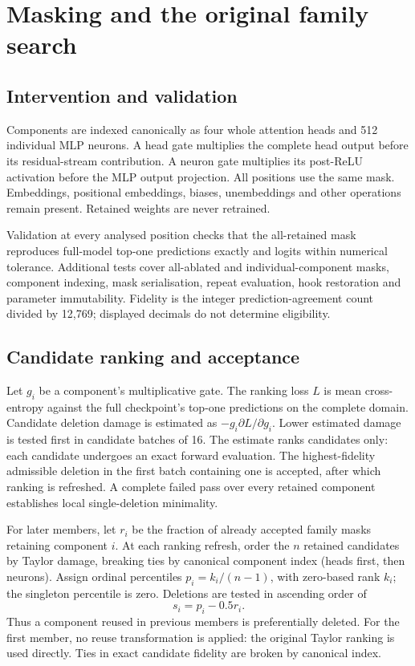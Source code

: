 \documentclass[10pt]{article}
\begin{document}
\section{Masking and the original family search}
\label{sec:ssearch}
\subsection{Intervention and validation}
Components are indexed canonically as four whole attention heads and 512 individual MLP neurons. A head gate multiplies the complete head output before its residual-stream contribution. A neuron gate multiplies its post-ReLU activation before the MLP output projection. All positions use the same mask. Embeddings, positional embeddings, biases, unembeddings and other operations remain present. Retained weights are never retrained.

Validation at every analysed position checks that the all-retained mask reproduces full-model top-one predictions exactly and logits within numerical tolerance. Additional tests cover all-ablated and individual-component masks, component indexing, mask serialisation, repeat evaluation, hook restoration and parameter immutability. Fidelity is the integer prediction-agreement count divided by 12,769; displayed decimals do not determine eligibility.

\subsection{Candidate ranking and acceptance}
Let $g_i$ be a component's multiplicative gate. The ranking loss $L$ is mean cross-entropy against the full checkpoint's top-one predictions on the complete domain. Candidate deletion damage is estimated as $-g_i\partial L/\partial g_i$. Lower estimated damage is tested first in candidate batches of 16. The estimate ranks candidates only: each candidate undergoes an exact forward evaluation. The highest-fidelity admissible deletion in the first batch containing one is accepted, after which ranking is refreshed. A complete failed pass over every retained component establishes local single-deletion minimality.

For later members, let $r_i$ be the fraction of already accepted family masks retaining component $i$. At each ranking refresh, order the $n$ retained candidates by Taylor damage, breaking ties by canonical component index (heads first, then neurons). Assign ordinal percentiles $p_i=k_i/(n-1)$, with zero-based rank $k_i$; the singleton percentile is zero. Deletions are tested in ascending order of
\[
 s_i=p_i-0.5r_i.
\]
Thus a component reused in previous members is preferentially deleted. For the first member, no reuse transformation is applied: the original Taylor ranking is used directly. Ties in exact candidate fidelity are broken by canonical index.
\end{document}
